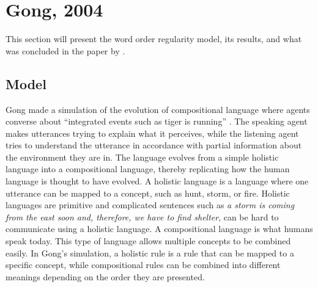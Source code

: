 
\section{Gong, 2004}\label{sec:Gong}
This section will present the word order regularity model, its results, and what was concluded in the paper by \citet{gong2004computational}. 

\subsection{Model}
Gong made a simulation of the evolution of compositional language  where agents converse about ``integrated events such as tiger is running'' \citep[Section 3]{gong2004computational}. The speaking agent makes utterances trying to explain what it perceives, while the listening agent tries to understand the utterance in accordance with partial information about the environment they are in. The language evolves from a simple holistic language into a compositional language, thereby replicating how the human language is thought to have evolved. A holistic language is a language where one utterance can be mapped to a concept, such as hunt, storm, or fire. Holistic languages are primitive and complicated sentences such as \textit{a storm is coming from the east soon and, therefore, we have to find shelter}, can be hard to communicate using a holistic language. A compositional language is what humans speak today. This type of language allows multiple concepts to be combined easily. In Gong's simulation, a holistic rule is a rule that can be mapped to a specific concept, while compositional rules can be combined into different meanings depending on the order they are presented.    

